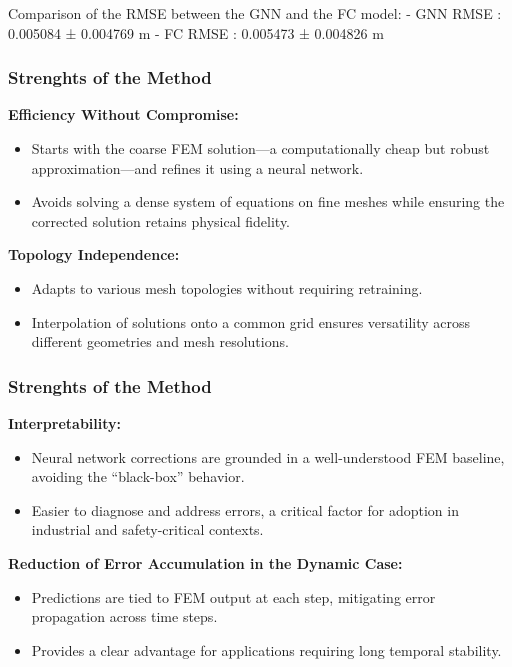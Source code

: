 \documentclass{beamer}
\begin{document}
Comparison of the RMSE between the GNN and the FC model:
        - GNN RMSE : 0.005084 ± 0.004769 m
        - FC RMSE : 0.005473 ± 0.004826 m
\fi

\begin{frame}
    \frametitle{Strenghts of the Method}
    \textbf{Efficiency Without Compromise:}
    \begin{itemize}
        \item Starts with the coarse FEM solution—a computationally cheap but robust approximation—and refines it using a neural network.
        \item Avoids solving a dense system of equations on fine meshes while ensuring the corrected solution retains physical fidelity.
    \end{itemize}
    \textbf{Topology Independence:}
    \begin{itemize}
        \item Adapts to various mesh topologies without requiring retraining.
        \item Interpolation of solutions onto a common grid ensures versatility across different geometries and mesh resolutions.
    \end{itemize}
\end{frame}

\begin{frame}
    \frametitle{Strenghts of the Method}
    \textbf{Interpretability:}
    \begin{itemize}
        \item Neural network corrections are grounded in a well-understood FEM baseline, avoiding the “black-box” behavior.
        \item Easier to diagnose and address errors, a critical factor for adoption in industrial and safety-critical contexts.
    \end{itemize}
    \textbf{Reduction of Error Accumulation in the Dynamic Case:}
    \begin{itemize}
        \item Predictions are tied to FEM output at each step, mitigating error propagation across time steps.
        \item Provides a clear advantage for applications requiring long temporal stability.
    \end{itemize}
\end{frame}
\end{document}
